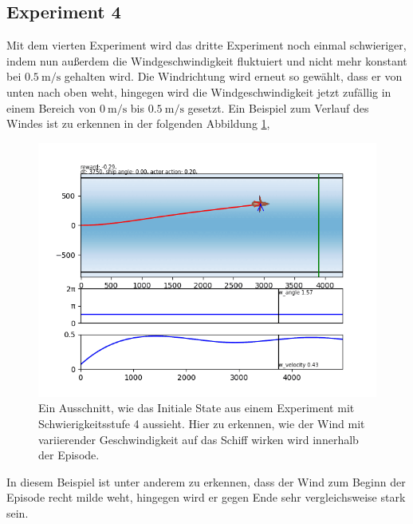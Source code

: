 \documentclass[]{iat}
\begin{document}
\subsection*{Experiment 4}
Mit dem vierten Experiment wird das dritte Experiment noch einmal schwieriger, indem nun außerdem die Windgeschwindigkeit fluktuiert und nicht mehr konstant bei $\SI{0.5}{\m\per\s}$ gehalten wird. Die Windrichtung wird erneut so gewählt, dass er von unten nach oben weht, hingegen wird die Windgeschwindigkeit jetzt zufällig in einem Bereich von $\SI{0}{\m\per\s}$ bis $\SI{0.5}{\m\per\s}$ gesetzt. Ein Beispiel zum Verlauf des Windes ist zu erkennen in der folgenden Abbildung \ref{abb:setting4},
\begin{figure}[H]
    \includegraphics[width=\textwidth]{graphics/settings/s4.png}
    \centering
    \caption{Ein Ausschnitt, wie das Initiale State aus einem Experiment mit Schwierigkeitsstufe 4 aussieht. Hier zu erkennen, wie der Wind mit variierender Geschwindigkeit auf das Schiff wirken wird innerhalb der Episode.}
    \label{abb:setting4}
\end{figure}
In diesem Beispiel ist unter anderem zu erkennen, dass der Wind zum Beginn der Episode recht milde weht, hingegen wird er gegen Ende sehr vergleichsweise stark sein.
\end{document}
